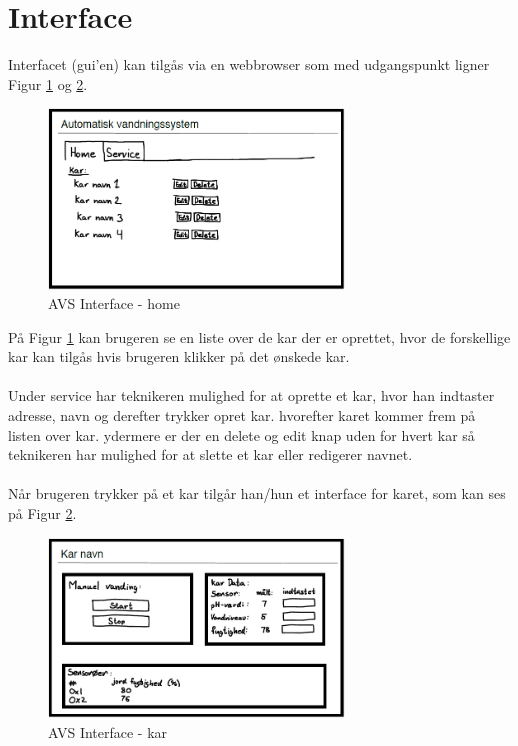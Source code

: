 \section{Interface}
Interfacet (\gls{gui}'en) kan tilgås via en webbrowser som med udgangspunkt ligner Figur \ref{fig:index} og \ref{fig:kar}.
\begin{figure}[H]
    \centering
    \includegraphics[width=0.7\textwidth]{Kravspecifikation/Interface/photo/index.PNG}
    \caption{AVS Interface - home}
    \label{fig:index}
\end{figure}
På Figur \ref{fig:index} kan brugeren se en liste over de kar der er oprettet, hvor de forskellige kar kan tilgås hvis brugeren klikker på det ønskede kar. 
\\\\
Under service har teknikeren mulighed for at oprette et \gls{kar}, hvor han indtaster adresse, navn og derefter trykker opret \gls{kar}. hvorefter karet kommer frem på listen over \gls{kar}. ydermere er der en delete og edit knap uden for hvert \gls{kar} så teknikeren har mulighed for at slette et \gls{kar} eller redigerer navnet. 
\\\\
Når brugeren trykker på et \gls{kar} tilgår han/hun et interface for \gls{kar}et, som kan ses på Figur \ref{fig:kar}. 
\begin{figure}[H]
    \centering
    \includegraphics[width=0.7\textwidth]{Kravspecifikation/Interface/photo/kar.PNG}
    \caption{AVS Interface - kar}
    \label{fig:kar}
\end{figure}

